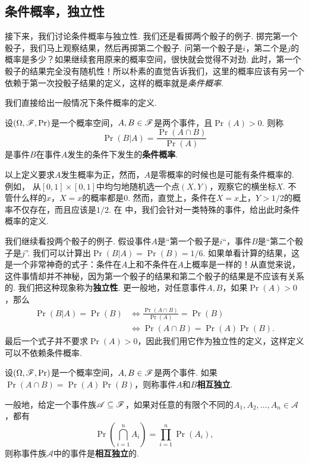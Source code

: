 \subsection{条件概率，独立性}
接下来，我们讨论条件概率与独立性. 我们还是看掷两个骰子的例子. 掷完第一个骰子，我们马上观察结果，然后再掷第二个骰子. 问第一个骰子是$i$，第二个是$j$的概率是多少？如果继续套用原来的概率空间，很快就会觉得不对劲. 此时，第一个骰子的结果完全没有随机性！所以朴素的直觉告诉我们，这里的概率应该有另一个依赖于第一次投骰子结果的定义，这样的概率就是\textit{条件概率}. 

我们直接给出一般情况下条件概率的定义. 

\begin{definition}[条件概率]
设$(\Omega,\mathscr{F},\Pr)$是一个概率空间，$A,B\in\mathscr{F}$是两个事件，且$\Pr(A)>0$. 则称
\[
    \Pr(B|A) = \frac{\Pr(A\cap B)}{\Pr(A)}
\]
是事件$B$在事件$A$发生的条件下发生的\textbf{条件概率}. 
\end{definition}

以上定义要求$A$发生概率为正，然而，$A$是零概率的时候也是可能有条件概率的. 例如，
从$[0,1]\times[0,1]$中均匀地随机选一个点$(X,Y)$，观察它的横坐标$X$. 不管什么样的$x$，$X=x$的概率都是$0$. 然而，直觉上，条件在$X=x$上，$Y>1/2$的概率不仅存在，而且应该是$1/2$. 在 中，我们会针对一类特殊的事件，给出此时条件概率的定义. 

我们继续看投两个骰子的例子. 假设事件$A$是“第一个骰子是$i$“，事件$B$是“第二个骰子是$j$”. 我们可以计算出$\Pr(B|A)=\Pr(B)=1/6$. 如果单看计算的结果，这是一个非常神奇的式子：条件在$A$上和不条件在$A$上概率是一样的！从直觉来说，这件事情却并不神秘，因为第一个骰子的结果和第二个骰子的结果是不应该有关系的. 我们把这种现象称为\textbf{独立性}. 更一般地，对任意事件$A,B$，如果$\Pr(A)>0$，那么
\begin{align*}
    \Pr(B|A)=\Pr(B)&\iff \frac{\Pr(A\cap B)}{\Pr(A)}=\Pr(B)\\
    &\iff \Pr(A\cap B)=\Pr(A)\Pr(B).
\end{align*}
最后一个式子并不要求$\Pr(A)>0$，因此我们用它作为独立性的定义，这样定义可以不依赖条件概率. 

\begin{definition}[独立性]
设$(\Omega,\mathscr{F},\Pr)$是一个概率空间，$A,B\in\mathscr{F}$是两个事件. 如果$\Pr(A\cap B)=\Pr(A)\Pr(B)$，则称事件$A$和$B$\textbf{相互独立}. 

一般地，给定一个事件族$\mathscr{A}\subseteq\mathscr{F}$，如果对任意的有限个不同的$A_1,A_2,\ldots,A_n\in\mathscr{A}$，都有
\[
    \Pr\left(\bigcap_{i=1}^n A_i\right) = \prod_{i=1}^n \Pr(A_i),
\]
则称事件族$\mathscr{A}$中的事件是\textbf{相互独立}的. 
\end{definition}

